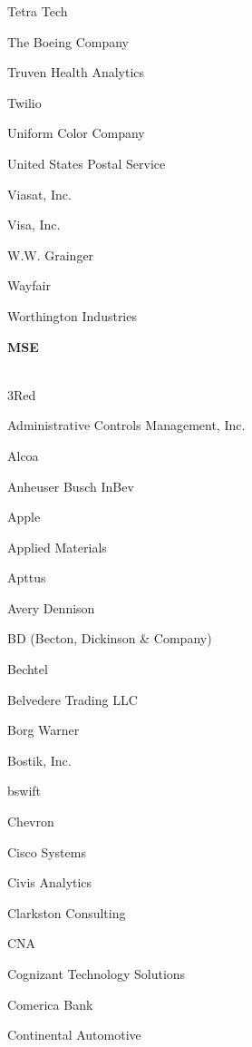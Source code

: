 \documentclass[twoside]{article}
\begin{document}
\begin{center}
\begin{multicols}{5}
\begin{FlushLeft}
\begin{compactitem}
\item Tetra Tech
\item The Boeing Company
\item Truven Health Analytics
\item Twilio
\item Uniform Color Company
\item United States Postal Service
\item Viasat, Inc.
\item Visa, Inc.
\item W.W. Grainger
\item Wayfair
\item Worthington Industries
\end{compactitem}
        \end{FlushLeft}
        \vspace{1em}
        {\fontsize{14}{16}\selectfont \bf MSE}\\
        \vspace{-1em}
        ~\hrulefill~
        \vspace{-.9em}
        \begin{FlushLeft}
        \begin{compactitem}
        \item 3Red
\item Administrative Controls Management, Inc.
\item Alcoa
\item Anheuser Busch InBev
\item Apple
\item Applied Materials
\item Apttus
\item Avery Dennison
\item BD (Becton, Dickinson \& Company)
\item Bechtel
\item Belvedere Trading LLC
\item Borg Warner
\item Bostik, Inc.
\item bswift
\item Chevron
\item Cisco Systems
\item Civis Analytics
\item Clarkston Consulting
\item CNA
\item Cognizant Technology Solutions
\item Comerica Bank
\item Continental Automotive

\end{compactitem}
\end{FlushLeft}
\end{multicols}
\end{center}
\end{document}

